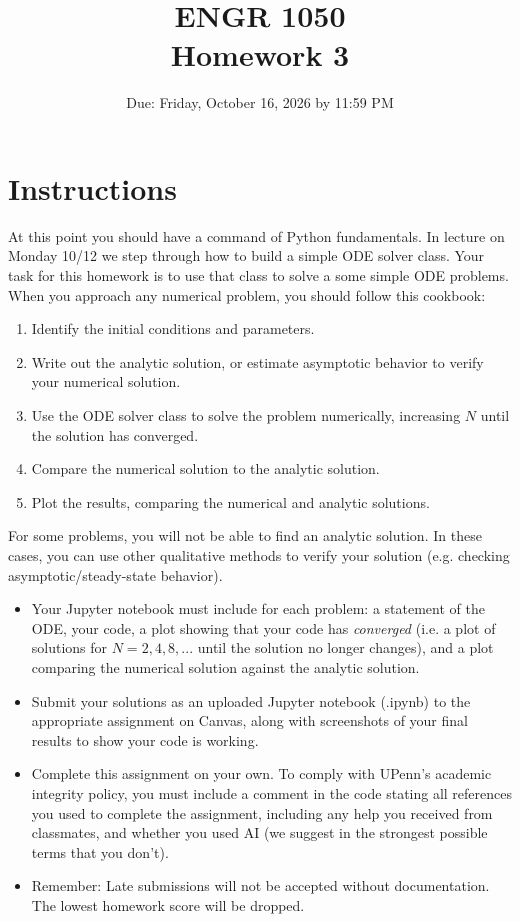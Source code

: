 \documentclass[12pt]{article}
\title{ENGR 1050 \\ Homework 3}
\author{Due: Friday, October 16, 2026 by 11:59 PM}
\date{}
\begin{document}
\maketitle

\section*{Instructions}
At this point you should have a command of Python fundamentals. In lecture on Monday 10/12 we step through how to build a simple ODE solver class. Your task for this homework is to use that class to solve a some simple ODE problems. When you approach any numerical problem, you should follow this cookbook:
\begin{enumerate}
    \item Identify the initial conditions and parameters.
    \item Write out the analytic solution, or estimate asymptotic behavior to verify your numerical solution.
    \item Use the ODE solver class to solve the problem numerically, increasing $N$ until the solution has converged.
    \item Compare the numerical solution to the analytic solution.
    \item Plot the results, comparing the numerical and analytic solutions.
\end{enumerate}

For some problems, you will not be able to find an analytic solution. In these cases, you can use other qualitative methods to verify your solution (e.g. checking asymptotic/steady-state behavior). 

\begin{itemize}
    \item Your Jupyter notebook must include for each problem: a statement of the ODE, your code, a plot showing that your code has \textit{converged} (i.e. a plot of solutions for $N= 2,4,8,...$ until the solution no longer changes), and a plot comparing the numerical solution against the analytic solution.
    \item Submit your solutions as an uploaded Jupyter notebook (.ipynb) to the appropriate assignment on Canvas, along with screenshots of your final results to show your code is working.
    \item Complete this assignment on your own. To comply with UPenn's academic integrity policy, you must include a comment in the code stating all references you used to complete the assignment, including any help you received from classmates, and whether you used AI (we suggest in the strongest possible terms that you don't). 
    \item Remember: Late submissions will not be accepted without documentation. The lowest homework score will be dropped.
\end{itemize}
\end{document}

